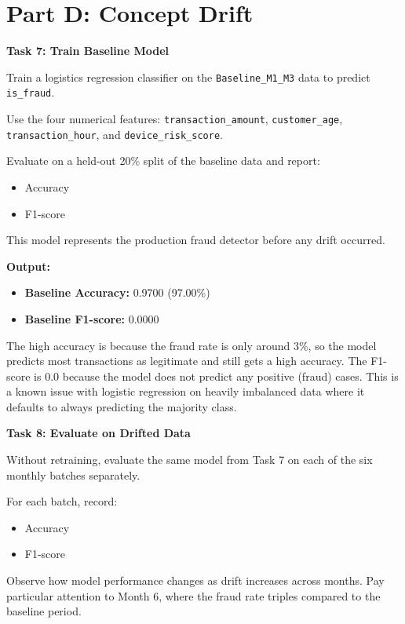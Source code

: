 \documentclass[12pt,a4paper]{article}
\begin{document}
\vspace{24pt}


\section*{Part D: Concept Drift}

\begin{tcolorbox}
\textbf{Task 7: Train Baseline Model}

Train a logistics regression classifier on the \texttt{Baseline\_M1\_M3} data to predict \texttt{is\_fraud}.

Use the four numerical features: \texttt{transaction\_amount}, \texttt{customer\_age}, \texttt{transaction\_hour}, and \texttt{device\_risk\_score}.

Evaluate on a held-out 20\% split of the baseline data and report:
\begin{itemize}
\item Accuracy
\item F1-score
\end{itemize}

This model represents the production fraud detector before any drift occurred.
\end{tcolorbox}

\vspace{6pt}

\textbf{Output:}

\begin{itemize}
\item \textbf{Baseline Accuracy:} 0.9700 (97.00\%)
\item \textbf{Baseline F1-score:} 0.0000
\end{itemize}

The high accuracy is because the fraud rate is only around 3\%, so the model predicts most transactions as legitimate and still gets a high accuracy. The F1-score is 0.0 because the model does not predict any positive (fraud) cases. This is a known issue with logistic regression on heavily imbalanced data where it defaults to always predicting the majority class.

\vspace{24pt}

\begin{tcolorbox}
\textbf{Task 8: Evaluate on Drifted Data}

Without retraining, evaluate the same model from Task 7 on each of the six monthly batches separately.

For each batch, record:
\begin{itemize}
\item Accuracy
\item F1-score
\end{itemize}

Observe how model performance changes as drift increases across months. Pay particular attention to Month 6, where the fraud rate triples compared to the baseline period.
\end{tcolorbox}
\end{document}
